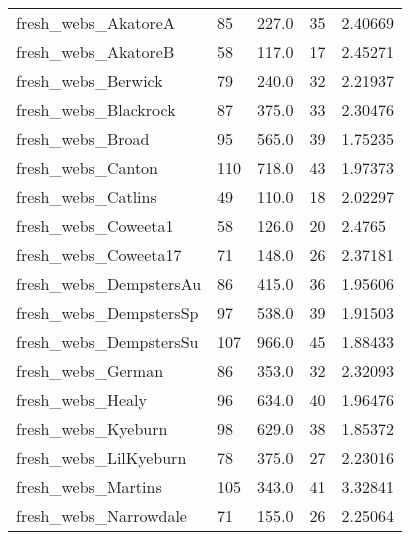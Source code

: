 \begin{longtable}{lllll}
 fresh\_webs\_AkatoreA                                & 85         & 227.0       & 35    & 2.40669    \\
 fresh\_webs\_AkatoreB                                & 58         & 117.0       & 17    & 2.45271    \\
 fresh\_webs\_Berwick                                 & 79         & 240.0       & 32    & 2.21937    \\
 fresh\_webs\_Blackrock                               & 87         & 375.0       & 33    & 2.30476    \\
 fresh\_webs\_Broad                                   & 95         & 565.0       & 39    & 1.75235    \\
 fresh\_webs\_Canton                                  & 110        & 718.0       & 43    & 1.97373    \\
 fresh\_webs\_Catlins                                 & 49         & 110.0       & 18    & 2.02297    \\
 fresh\_webs\_Coweeta1                                & 58         & 126.0       & 20    & 2.4765     \\
 fresh\_webs\_Coweeta17                               & 71         & 148.0       & 26    & 2.37181    \\
 fresh\_webs\_DempstersAu                             & 86         & 415.0       & 36    & 1.95606    \\
 fresh\_webs\_DempstersSp                             & 97         & 538.0       & 39    & 1.91503    \\
 fresh\_webs\_DempstersSu                             & 107        & 966.0       & 45    & 1.88433    \\
 fresh\_webs\_German                                  & 86         & 353.0       & 32    & 2.32093    \\
 fresh\_webs\_Healy                                   & 96         & 634.0       & 40    & 1.96476    \\
 fresh\_webs\_Kyeburn                                 & 98         & 629.0       & 38    & 1.85372    \\
 fresh\_webs\_LilKyeburn                              & 78         & 375.0       & 27    & 2.23016    \\
 fresh\_webs\_Martins                                 & 105        & 343.0       & 41    & 3.32841    \\
 fresh\_webs\_Narrowdale                              & 71         & 155.0       & 26    & 2.25064    \\

\end{longtable}
